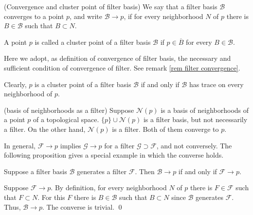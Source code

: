 \documentclass{report}
\begin{document}
\begin{dfn} (Convergence and cluster point of filter basis)
    We say that a filter basis \( \mathscr{B} \) converges to a point \( p \), and write \( \mathscr{B} \to p \), if for every neighborhood \( N \) of \( p \) there is \( B \in \mathscr{B} \) such that \( B \subset N \).

    A point \( p \) is called a cluster point of a filter basis \( \mathscr{B} \) if \( p \in \overline{B} \) for every \( B \in \mathscr{B} \).
\end{dfn}

\begin{rem}
    Here we adopt, as definition of convergence of filter basis, the necessary and sufficient condition of convergence of filter. See remark \ref{rem filter convergence}.
\end{rem}

\begin{rem}
    Clearly, \( p \) is a cluster point of a filter basis \( \mathscr{B} \) if and only if \( \mathscr{B} \) has trace on every neighborhood of \( p \).
\end{rem}

\begin{ex}\label{example local basis} (basis of neighborhoods as a filter)
    Suppose \( \mathscr{N}(p) \) is a basis of neighborhoods of a point \( p \) of a topological space.
    \( \{p\} \cup \mathscr{N}(p) \) is a filter basis, but not necessarily a filter. On the other hand, \( \mathscr{N}(p) \) is a filter. Both of them converge to \( p \).
\end{ex}

In general, \( \mathscr{F}\to p \) implies \( \mathscr{G}\to p \) for a filter \( \mathscr{G} \supset \mathscr{F} \), and not conversely. The following proposition gives a special example in which the converse holds.
\begin{prp}
    Suppose a filter basis \( \mathscr{B} \) generates a filter \( \mathscr{F} \). Then \( \mathscr{B}\to p \) if and only if \( \mathscr{F}\to p \).
\end{prp}
\begin{prf}
    Suppose \( \mathscr{F}\to p \). By definition, for every neighborhood \( N \) of \( p \) there is \( F \in \mathscr{F} \) such that \( F \subset N \). For this \( F \) there is \( B \in \mathscr{B} \) such that \( B \subset N \) since \( \mathscr{B} \) generates \( \mathscr{F} \). Thus, \( \mathscr{B}\to p \). The converse is trivial.
    \qed\end{prf}
\end{document}
